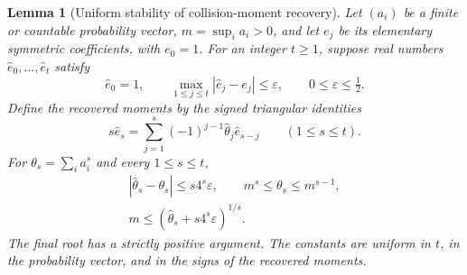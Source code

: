\documentclass[11pt]{article}
\newtheorem{lemma}[theorem]{Lemma}
\theoremstyle{definition}
\begin{document}
\begin{lemma}[Uniform stability of collision-moment recovery]
\label{lem:empirical-collision-moment-stability}
Let $(a_i)$ be a finite or countable probability vector,
$m=\sup_i a_i>0$, and let $e_j$ be its elementary symmetric
coefficients, with $e_0=1$.
For an integer $t\ge1$, suppose real numbers
$\widehat e_0,\ldots,\widehat e_t$ satisfy
\begin{equation}
 \widehat e_0=1,\qquad
 \max_{1\le j\le t}|\widehat e_j-e_j|\le\varepsilon,
                   \qquad 0\le\varepsilon\le\tfrac12 .
 \label{eq:empirical-moment-coefficient-error}
\end{equation}
Define the recovered moments by the signed triangular identities
\begin{equation}
 s\widehat e_s
    =\sum_{j=1}^s(-1)^{j-1}
                \widehat\theta_j\widehat e_{s-j}
                         \qquad(1\le s\le t).
 \label{eq:empirical-moment-newton}
\end{equation}
For $\theta_s=\sum_i a_i^s$ and every $1\le s\le t$,
\begin{equation}
 \begin{gathered}
 |\widehat\theta_s-\theta_s|
                   \le s4^s\varepsilon,\qquad
                  m^s\le\theta_s\le m^{s-1},\\
 m\le(\widehat\theta_s+s4^s\varepsilon)^{1/s}.
 \end{gathered}
 \label{eq:empirical-moment-recovery-bound}
\end{equation}
The final root has a strictly positive argument.
The constants are uniform in $t$, in the probability vector,
and in the signs of the recovered moments.
\end{lemma}
\end{document}
